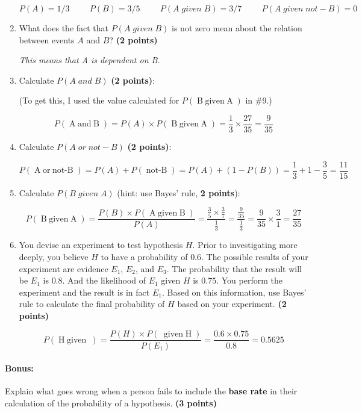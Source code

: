 \documentclass[10pt]{article}
\newcommand\negate[1]{\mathop{\mbox{$not$-$#1$}}}
\newcommand\disjoin[2]{\mathop{\mbox{$#1\; or\; #2$}}}
\newcommand\conjoin[2]{\mathop{\mbox{$#1\; and\; #2$}}}
\newcommand\given[2]{\mathop{\mbox{$#1\; given\; #2$}}}
\begin{document}
\begin{enumerate}
\[P(A) = 1/3 \hspace{1cm} P(B) = 3/5  \hspace{1cm} P(A\; given\; B) = 3/7 \hspace{1cm} P(A\; given\; not-B) = 0\]

 \itemsep7mm

 \item What does the fact that $P(A\; given\; B)$ is not zero mean about the relation between events $A$ and $B$? \textbf{(2 points)}
 
 \textit{This means that A is dependent on B.}
 
 \item Calculate $P(A\; and\; B)$ \textbf{(2 points)}:
 
 (To get this, I used the value calculated for $P(\given{B}{A})$ in \#9.)
 
 \[P(\conjoin{A}{B}) = P(A) \times P(\given{B}{A}) = \frac{1}{3} \times \frac{27}{35} = \frac{9}{35} \]
 
 \item Calculate $P(A\; or\; not-B)$ \textbf{(2 points)}:
 
 \[P(\disjoin{A}{\negate{B}}) = P(A) + P(\negate{B}) = P(A) + (1 - P(B)) = \frac{1}{3} + 1 - \frac{3}{5} = \frac{11}{15}\]
 
 \item Calculate $P(B\; given\; A)$ (hint: use Bayes' rule, \textbf{2 points}):
 
 \[P(\given{B}{A}) = \frac{P(B) \times P(\given{A}{B})}{P(A)} = \frac{\frac{3}{5} \times \frac{3}{7}}{\frac{1}{3}} = \frac{\frac{9}{35}}{\frac{1}{3}} = \frac{9}{35} \times \frac{3}{1} = \frac{27}{35} \]
 
 \item You devise an experiment to test hypothesis $H$. Prior to investigating more deeply, you believe $H$ to have a probability of $0.6$. The possible results of your experiment are evidence $E_1$, $E_2$, and $E_3$.  The probability that the result will be $E_1$ is $0.8$. And the likelihood of $E_1$ given $H$ is $0.75$.  You perform the experiment and the result is in fact $E_1$. Based on this information, use Bayes' rule to calculate the final probability of $H$ based on your experiment. \textbf{(2 points)}
 
 \[P(\given{H}{E_1}) = \frac{P(H)\times P(\given{E_1}{H})}{P(E_1)} = \frac{0.6 \times 0.75}{0.8} = 0.5625\]
\end{enumerate}
  
\paragraph{Bonus:}  Explain what goes wrong when a person fails to include the \textbf{base rate} in their calculation of the probability of a hypothesis. \textbf{(3 points)}
\end{document}
